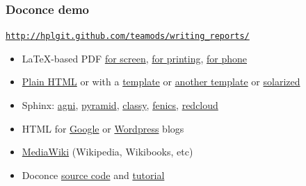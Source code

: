 \documentclass{beamer}
\begin{document}
\begin{frame}
\frametitle{Doconce demo}

\href{{http://hplgit.github.com/teamods/writing_reports/}}{\nolinkurl{http://hplgit.github.com/teamods/writing_reports/}}

\begin{itemize}
 \item LaTeX-based PDF \href{{http://hplgit.github.com/teamods/writing_reports/_static/report.pdf}}{for screen}, \href{{http://hplgit.github.com/teamods/writing_reports/_static/report_4printing.pdf}}{for printing}, \href{{http://hplgit.github.com/teamods/writing_reports/_static/report_4phone.pdf}}{for phone}

 \item \href{{http://hplgit.github.com/teamods/writing_reports/_static/report_do.html}}{Plain HTML} or with a \href{{http://hplgit.github.com/teamods/writing_reports/_static/report_vagrant.html}}{template} or \href{{http://hplgit.github.com/teamods/writing_reports/_static/report_github_minimal.html}}{another template} or \href{{http://hplgit.github.com/teamods/writing_reports/_static/report_solarized.html}}{solarized}

 \item Sphinx: \href{{http://hplgit.github.com/teamods/writing_reports/_static/sphinx-agni/index.html}}{agni}, \href{{http://hplgit.github.com/teamods/writing_reports/_static/sphinx-pyramid/report.html}}{pyramid}, \href{{http://hplgit.github.com/teamods/writing_reports/_static/sphinx-classy/report.html}}{classy}, \href{{http://hplgit.github.com/teamods/writing_reports/_static/sphinx-fenics_minimal/report.html}}{fenics}, \href{{http://hplgit.github.com/teamods/writing_reports/_static/sphinx-fenics_minimal/report.html}}{redcloud}

 \item HTML for \href{{http://doconce-report-demo.blogspot.no/}}{Google} or \href{{http://doconcereportdemo.wordpress.com/}}{Wordpress} blogs

 \item \href{{http://doconcedemo.shoutwiki.com/wiki/Doconce_demo_page}}{MediaWiki} (Wikipedia, Wikibooks, etc)

 \item Doconce \href{{http://hplgit.github.com/teamods/writing_reports/_static/report.do.txt.html}}{source code} and \href{{http://code.google.com/p/doconce/wiki/Tutorial}}{tutorial}
\end{itemize}

\noindent
\end{frame}
\end{document}
